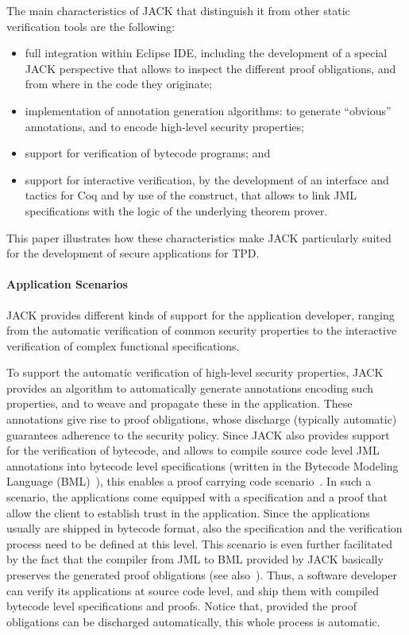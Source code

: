 The main characteristics of JACK that distinguish it from other static
verification tools are the following:
\begin{itemize}
\item full integration within Eclipse IDE, including the development of a
special JACK perspective that allows to inspect the different proof
obligations, and from where in the code they originate;
\item implementation of annotation generation algorithms: to
generate ``obvious'' annotations, and to encode high-level security
properties;
\item support for verification of bytecode programs; and
\item support for interactive verification, by the development of an interface
and tactics for Coq and by use of the \native construct, that allows to
link JML specifications with the logic of the underlying theorem
prover. 
\end{itemize}
This paper illustrates how these characteristics make JACK
particularly suited for the development of secure applications for
TPD.

\paragraph{Application Scenarios}
JACK provides different kinds of support for the application
developer, ranging from the automatic verification of common
security properties to the interactive verification of complex
functional specifications.

To support the automatic verification of high-level security
properties, JACK provides an algorithm to automatically generate
annotations encoding such properties, and to weave and propagate these
in the application. These annotations give rise to proof obligations,
whose discharge (typically automatic) guarantees adherence to the
security policy. Since JACK also provides support for the verification
of bytecode, and allows to compile source code level JML annotations
into bytecode level specifications (written in the Bytecode Modeling
Language (BML)~\cite{BurdyHP07}), this enables a proof carrying code
scenario~\cite{Necula97}. In such a scenario, the applications come
equipped with a specification and a proof that allow the client to
establish trust in the application. Since the applications usually are
shipped in bytecode format, also the specification and the
verification process need to be defined at this level. This scenario
is even further facilitated by the fact that the compiler from JML to
BML provided by JACK basically preserves the generated proof
obligations (see also~\cite{gta05:fast}). Thus, a software developer
can verify its applications at source code level, and ship them with
compiled bytecode level specifications and proofs. Notice that,
provided the proof obligations can be discharged automatically, this
whole process is automatic.

